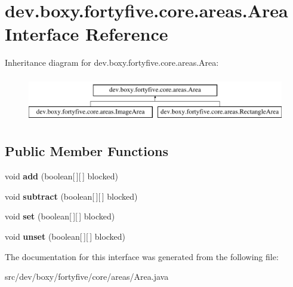 \hypertarget{interfacedev_1_1boxy_1_1fortyfive_1_1core_1_1areas_1_1_area}{
\section{dev.boxy.fortyfive.core.areas.Area Interface Reference}
\label{d9/d22/interfacedev_1_1boxy_1_1fortyfive_1_1core_1_1areas_1_1_area}
}
Inheritance diagram for dev.boxy.fortyfive.core.areas.Area:\begin{figure}[H]
\begin{center}
\leavevmode
\includegraphics[height=2.000000cm]{d9/d22/interfacedev_1_1boxy_1_1fortyfive_1_1core_1_1areas_1_1_area}
\end{center}
\end{figure}
\subsection*{Public Member Functions}
\begin{DoxyCompactItemize}
\item 
\hypertarget{interfacedev_1_1boxy_1_1fortyfive_1_1core_1_1areas_1_1_area_af96da254422f79119f44eb66463f0657}{
void {\bfseries add} (boolean\mbox{[}$\,$\mbox{]}\mbox{[}$\,$\mbox{]} blocked)}
\label{d9/d22/interfacedev_1_1boxy_1_1fortyfive_1_1core_1_1areas_1_1_area_af96da254422f79119f44eb66463f0657}

\item 
\hypertarget{interfacedev_1_1boxy_1_1fortyfive_1_1core_1_1areas_1_1_area_a247329d556f18afe256076322abeeba7}{
void {\bfseries subtract} (boolean\mbox{[}$\,$\mbox{]}\mbox{[}$\,$\mbox{]} blocked)}
\label{d9/d22/interfacedev_1_1boxy_1_1fortyfive_1_1core_1_1areas_1_1_area_a247329d556f18afe256076322abeeba7}

\item 
\hypertarget{interfacedev_1_1boxy_1_1fortyfive_1_1core_1_1areas_1_1_area_a3692044faaa1541ae8f1d480ae111e07}{
void {\bfseries set} (boolean\mbox{[}$\,$\mbox{]}\mbox{[}$\,$\mbox{]} blocked)}
\label{d9/d22/interfacedev_1_1boxy_1_1fortyfive_1_1core_1_1areas_1_1_area_a3692044faaa1541ae8f1d480ae111e07}

\item 
\hypertarget{interfacedev_1_1boxy_1_1fortyfive_1_1core_1_1areas_1_1_area_aa30374b90a0dd9e186dc771bf29657e7}{
void {\bfseries unset} (boolean\mbox{[}$\,$\mbox{]}\mbox{[}$\,$\mbox{]} blocked)}
\label{d9/d22/interfacedev_1_1boxy_1_1fortyfive_1_1core_1_1areas_1_1_area_aa30374b90a0dd9e186dc771bf29657e7}

\end{DoxyCompactItemize}


The documentation for this interface was generated from the following file:\begin{DoxyCompactItemize}
\item 
src/dev/boxy/fortyfive/core/areas/Area.java\end{DoxyCompactItemize}
